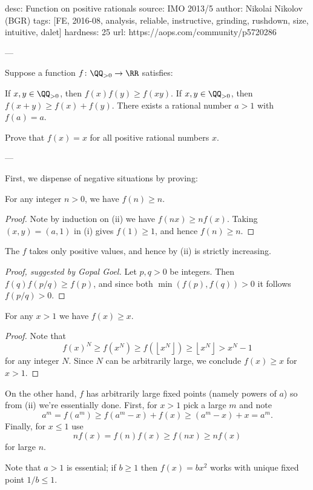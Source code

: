 desc: Function on positive rationals
source: IMO 2013/5
author: Nikolai Nikolov (BGR)
tags: [FE, 2016-08, analysis, reliable, instructive, grinding, rushdown, size, intuitive, dalet]
hardness: 25
url: https://aops.com/community/p5720286

---

Suppose a function $f \colon \QQ_{>0} \to \RR$ satisfies:
\begin{enumerate}
  \ii [(i)] If $x,y \in \QQ_{>0}$, then $f(x)f(y) \ge f(xy)$.
  \ii [(ii)] If $x,y \in \QQ_{>0}$, then $f(x+y) \ge f(x) + f(y)$.
  \ii [(iii)] There exists a rational number $a > 1$ with $f(a) = a$.
\end{enumerate}
Prove that $f(x) = x$ for all positive rational numbers $x$.

---

First, we dispense of negative situations by proving:
\begin{claim*}
  For any integer $n > 0$, we have $f(n) \ge n$.
\end{claim*}
\begin{proof}
  Note by induction on (ii) we have $f(nx) \ge n f(x)$.
  Taking $(x,y) = (a,1)$ in (i) gives $f(1) \ge 1$,
  and hence $f(n) \ge n$.
\end{proof}

\begin{claim*}
  The $f$ takes only positive values,
  and hence by (ii) is strictly increasing.
\end{claim*}
\begin{proof}[Proof, suggested by Gopal Goel]
  Let $p,q > 0$ be integers.
  Then $f(q) f(p/q) \ge f(p)$,
  and since both $\min(f(p), f(q)) > 0$
  it follows $f(p/q) > 0$.
\end{proof}

\begin{claim*}
  For any $x > 1$ we have $f(x) \ge x$.
\end{claim*}
\begin{proof}
  Note that
  \[ f(x)^N \ge f(x^N) \ge f\left( \left\lfloor x^N \right\rfloor \right)
    \ge \left\lfloor x^N \right\rfloor > x^N-1 \]
  for any integer $N$.
  Since $N$ can be arbitrarily large,
  we conclude $f(x) \ge x$ for $x > 1$.
\end{proof}

On the other hand, $f$ has arbitrarily large fixed points
(namely powers of $a$) so from (ii) we're essentially done.
First, for $x > 1$ pick a large $m$ and note
\[ a^m = f(a^m) \ge f(a^m-x) + f(x) \ge (a^m-x)+x = a^m. \]
Finally, for $x \le 1$ use
\[ nf(x) = f(n)f(x) \ge f(nx) \ge nf(x) \]
for large $n$.

\begin{remark*}
Note that $a > 1$ is essential;
if $b \ge 1$ then $f(x) = bx^2$ works with unique fixed point $1/b \le 1$.
\end{remark*}
